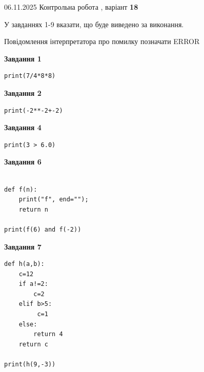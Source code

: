 \documentclass[12pt, ukrainian]{article}
\begin{document}
{\Large{06.11.2025 Контрольна робота , варіант  \No \textbf { 18 }\par}}
{
\begin {large}
У завданнях 1-9 вказати, що буде виведено за виконання.

Повідомлення інтерпретатора про помилку позначати ERROR

\begin{minipage}[t]{7.5cm}

\begin{center}
\textbf{Завдання 1}
\end{center}

\begin{verbatim}
print(7/4*8*8)
\end{verbatim}



\begin{center}
\textbf{Завдання 2}
\end{center}

\begin{verbatim}
print(-2**-2+-2)
\end{verbatim}



\begin{center}
\textbf{Завдання 4}
\end{center}

\begin{verbatim}
print(3 > 6.0)
\end{verbatim}



\begin{center}
\textbf{Завдання 6}
\end{center}

\begin{verbatim}

def f(n):
    print("f", end="");
    return n

print(f(6) and f(-2))
\end{verbatim}



\begin{center}
\textbf{Завдання 7}
\end{center}

\begin{verbatim}
def h(a,b):
    c=12
    if a!=2:
        c=2
    elif b>5:
         c=1
    else: 
        return 4
    return c

print(h(9,-3))
\end{verbatim}


\end{minipage}
\end{large}}
\end{document}
